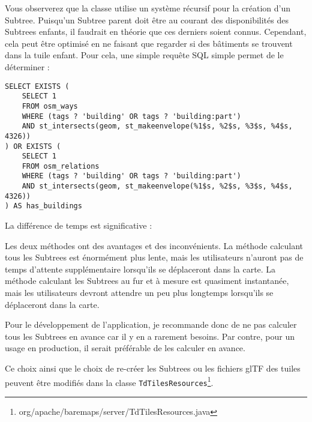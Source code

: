 Vous observerez que la classe utilise un système récursif pour la création d'un Subtree. Puisqu'un Subtree parent doit être au courant des disponibilités des Subtrees enfants, il faudrait en théorie que ces derniers soient connus. Cependant, cela peut être optimisé en ne faisant que regarder si des bâtiments se trouvent dans la tuile enfant. Pour cela, une simple requête SQL simple permet de le déterminer :

\begin{verbatim}
SELECT EXISTS (
    SELECT 1
    FROM osm_ways
    WHERE (tags ? 'building' OR tags ? 'building:part')
    AND st_intersects(geom, st_makeenvelope(%1$s, %2$s, %3$s, %4$s, 4326))
) OR EXISTS (
    SELECT 1
    FROM osm_relations
    WHERE (tags ? 'building' OR tags ? 'building:part')
    AND st_intersects(geom, st_makeenvelope(%1$s, %2$s, %3$s, %4$s, 4326))
) AS has_buildings
\end{verbatim}

La différence de temps est significative :

\begin{listing}[h]
    
\end{listing}

Les deux méthodes ont des avantages et des inconvénients. La méthode calculant tous les Subtrees est énormément plus lente, mais les utilisateurs n'auront pas de temps d'attente supplémentaire lorsqu'ils se déplaceront dans la carte. La méthode calculant les Subtrees au fur et à mesure est quasiment instantanée, mais les utilisateurs devront attendre un peu plus longtemps lorsqu'ils se déplaceront dans la carte.

Pour le développement de l'application, je recommande donc de ne pas calculer tous les Subtrees en avance car il y en a rarement besoins. Par contre, pour un usage en production, il serait préférable de les calculer en avance.

Ce choix ainsi que le choix de re-créer les Subtrees ou les fichiers glTF des tuiles peuvent être modifiés dans la classe \texttt{TdTilesResources}\footnote{org/apache/baremaps/server/TdTilesResources.java}.